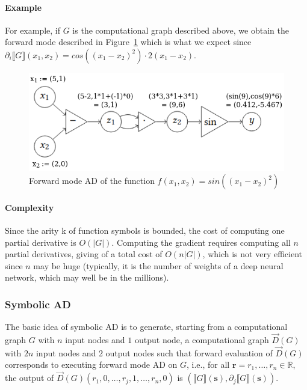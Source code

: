\paragraph{Example} For example, if $G$ is the computational graph described above, we obtain the forward mode described in Figure~\ref{compGraph2FM} which is what we expect since $\partial_i \llbracket G \rrbracket (x_1,x_2)= cos((x_1-x_2)^2) \cdot 2(x_1-x_2)$.
\begin{figure}[h!]
	\centering
	\includegraphics[scale=0.5]{img/compGraph2FM}
	\caption{Forward mode AD of the function $f(x_1,x_2)=sin((x_1-x_2)^2)$}
	\label{compGraph2FM}
\end{figure}

\paragraph{Complexity} Since the arity k of function symbols is bounded, the cost of computing one partial derivative is $O(|G|)$. Computing the gradient requires computing all $n$ partial derivatives, giving of a total cost of $O(n |G|)$, which is not very eﬃcient
since $n$ may be huge (typically, it is the number of weights of a deep neural network, which may well be in the millions).

\subsubsection{Symbolic AD}
The basic idea of symbolic AD is to generate, starting from a computational graph $G$ with $n$ input nodes and $1$ output node, a computational graph $\stackrel{\rightarrow}{D}(G)$ with $2n$ input nodes and 2 output nodes such that forward evaluation of $\stackrel{\rightarrow}{D}(G)$ corresponds to executing forward mode AD on $G$, i.e., for all $\mathbf{r}= r_1, \dots, r_n \in \mathbb{R}$, the output of $\stackrel{\rightarrow}{D}(G)(r_1,0,\dots, r_j,1, \dots,r_n,0)$ is $(\llbracket G \rrbracket(\mathbf{s}), \partial_j \llbracket G \rrbracket(\mathbf{s}))$.

